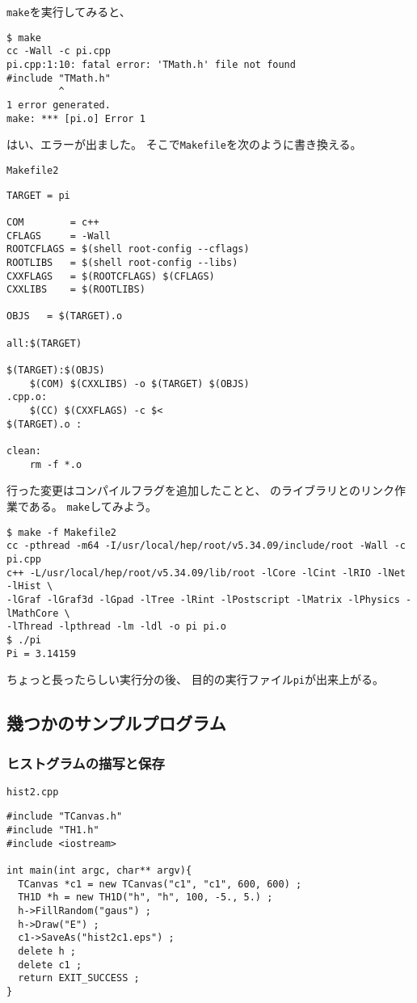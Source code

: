   
  \verb|make|を実行してみると、
\begin{verbatim}
$ make
cc -Wall -c pi.cpp
pi.cpp:1:10: fatal error: 'TMath.h' file not found
#include "TMath.h"
         ^
1 error generated.
make: *** [pi.o] Error 1
\end{verbatim}
はい、エラーが出ました。
そこで\texttt{Makefile}を次のように書き換える。
\begin{itembox}{\texttt{Makefile2}}
 \begin{verbatim}
TARGET = pi

COM        = c++
CFLAGS     = -Wall
ROOTCFLAGS = $(shell root-config --cflags)
ROOTLIBS   = $(shell root-config --libs)
CXXFLAGS   = $(ROOTCFLAGS) $(CFLAGS)
CXXLIBS    = $(ROOTLIBS)

OBJS   = $(TARGET).o

all:$(TARGET)

$(TARGET):$(OBJS)
	$(COM) $(CXXLIBS) -o $(TARGET) $(OBJS)
.cpp.o:
	$(CC) $(CXXFLAGS) -c $<
$(TARGET).o :

clean:
	rm -f *.o
 \end{verbatim}
\end{itembox}
行った変更はコンパイルフラグを追加したことと、
\ROOT のライブラリとのリンク作業である。
\verb|make|してみよう。
\begin{verbatim}
$ make -f Makefile2
cc -pthread -m64 -I/usr/local/hep/root/v5.34.09/include/root -Wall -c pi.cpp
c++ -L/usr/local/hep/root/v5.34.09/lib/root -lCore -lCint -lRIO -lNet -lHist \
-lGraf -lGraf3d -lGpad -lTree -lRint -lPostscript -lMatrix -lPhysics -lMathCore \
-lThread -lpthread -lm -ldl -o pi pi.o
$ ./pi 
Pi = 3.14159
\end{verbatim}
ちょっと長ったらしい実行分の後、
目的の実行ファイル\texttt{pi}が出来上がる。


\subsection{幾つかのサンプルプログラム}


   \subsubsection{ヒストグラムの描写と保存}
     \begin{itembox}{\texttt{hist2.cpp}}
\begin{verbatim}
#include "TCanvas.h"
#include "TH1.h"
#include <iostream>

int main(int argc, char** argv){
  TCanvas *c1 = new TCanvas("c1", "c1", 600, 600) ;
  TH1D *h = new TH1D("h", "h", 100, -5., 5.) ;
  h->FillRandom("gaus") ;
  h->Draw("E") ;
  c1->SaveAs("hist2c1.eps") ;
  delete h ;
  delete c1 ;
  return EXIT_SUCCESS ;
}
\end{verbatim}
     \end{itembox}

